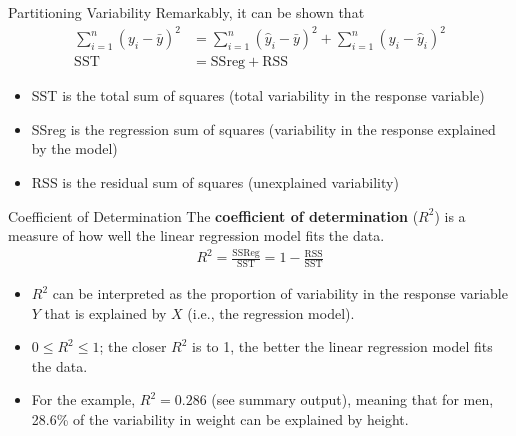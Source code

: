 \documentclass[10pt]{beamer}
\begin{document}
\begin{frame}{Partitioning Variability}
Remarkably, it can be shown that
\begin{align*}
\sum_{i=1}^n (y_i - \bar{y})^2 &= \sum_{i=1}^n (\hat{y}_i - \bar{y})^2 + \sum_{i=1}^n (y_i - \hat{y}_i)^2\\
\text{SST} &= \text{SSreg} + \text{RSS}
\end{align*}
\begin{itemize}
\item SST is the total sum of squares (total variability in the response variable)
\item SSreg is the regression sum of squares (variability in the response explained by the model)
\item RSS is the residual sum of squares (unexplained variability)
\end{itemize}
\end{frame}

\begin{frame}{Coefficient of Determination}
The \textbf{coefficient of determination} ($R^2$) is a measure of how well the linear regression model fits the data.
\begin{align*}
R^2 = \frac{\text{SSReg}}{\text{SST}} = 1 - \frac{\text{RSS}}{\text{SST}}
\end{align*}
\vspace{10pt}
\begin{itemize}
\item $R^2$ can be interpreted as the proportion of variability in the response variable $Y$ that is explained by $X$ (i.e., the regression model).
\vspace{5pt}
\item $0 \leq R^2 \leq 1$; the closer $R^2$ is to 1, the better the linear regression model fits the data.
\vspace{5pt}
\item For the example, $R^2 = 0.286$ (see summary output), meaning that for men, 28.6\% of the variability in weight can be explained by height.
\end{itemize}
\end{frame}
\end{document}
